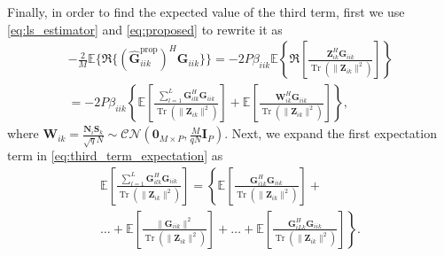 \documentclass[10pt,journal,comsoc,final]{IEEEtran}
\DeclareMathOperator{\Tr}{Tr}
\begin{document}
Finally, in order to find the expected value of the third term, first we use \eqref{eq:ls_estimator} and \eqref{eq:proposed} to rewrite it as
\begin{equation}\label{eq:third_term_expectation}
\begin{split}
-\frac{2}{M}\mathbb{E} \{\mathfrak{R}\{ (\hat{\textbf{G}}_{iik}^{\text{prop}})^{H} \textbf{G}_{iik} \}\} =  -2P \beta_{iik} \mathbb{E} \left\lbrace \mathfrak{R} \left[ \frac{\textbf{Z}_{ik}^{H} \textbf{G}_{iik} }{\Tr \left( \lVert \textbf{Z}_{ik} \rVert^{2} \right)}  \right] \right\rbrace \\
= -2P \beta_{iik} \left\lbrace \mathbb{E} \left[ \frac{\sum_{l=1}^{L} \textbf{G}_{ilk}^{H} \textbf{G}_{iik}}{\Tr \left( \lVert \textbf{Z}_{ik} \rVert^{2} \right)} \right] + \mathbb{E} \left[ \frac{\textbf{W}_{ik}^{H} \textbf{G}_{iik}}{\Tr \left( \lVert \textbf{Z}_{ik} \rVert^{2} \right)} \right] \right\rbrace,
\end{split}
\end{equation}
where $\textbf{W}_{ik} = \frac{\textbf{N}_{i}\textbf{S}_{k}}{\sqrt{q}N} \sim \mathcal{CN}(\textbf{0}_{M \times P},\frac{M}{qN}\textbf{I}_{P})$. Next, we expand the first expectation term in \eqref{eq:third_term_expectation} as
\begin{equation}\label{eq:third_term_expectation_1}
\begin{split}
\mathbb{E} \left[ \frac{\sum_{l=1}^{L} \textbf{G}_{ilk}^{H} \textbf{G}_{iik}}{\Tr \left( \lVert \textbf{Z}_{ik} \rVert^{2} \right)} \right] = \left\lbrace \mathbb{E} \left[ \frac{ \textbf{G}_{i1k}^{H} \textbf{G}_{iik}}{\Tr \left( \lVert \textbf{Z}_{ik} \rVert^{2} \right)} \right] +  \right. \\ \left.  \ldots + \mathbb{E} \left[ \frac{ \lVert \textbf{G}_{iik} \rVert^{2} } {\Tr \left( \lVert \textbf{Z}_{ik} \rVert^{2} \right)} \right] + \ldots + \mathbb{E} \left[ \frac{ \textbf{G}_{iLk}^{H} \textbf{G}_{iik}}{\Tr \left( \lVert \textbf{Z}_{ik} \rVert^{2} \right)} \right]  \right\rbrace.
\end{split}
\end{equation}
\end{document}

